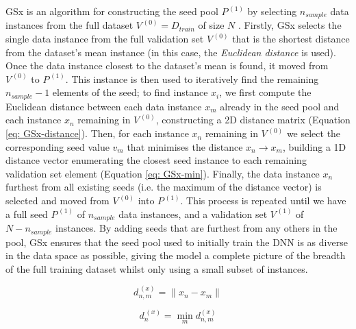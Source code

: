 \documentclass[a4paper, 11pt]{report}
\begin{document}
    GSx \citep{wu-2019} is an algorithm for constructing the seed pool $P^{\,(1)}$ by selecting $n_{sample}$ data instances from the full dataset $V^{\,(0)} = D_{train}$ of size $N$ \citep{wu-2019}. Firstly, GSx selects the single data instance from the full validation set $V^{\,(0)}$ that is the shortest distance from the dataset's mean instance (in this case, the \emph{Euclidean distance} is used). Once the data instance closest to the dataset's mean is found, it moved from $V^{\,(0)}$ to $P^{\,(1)}$. This instance is then used to iteratively find the remaining $n_{sample} - 1$ elements of the seed; to find instance $x_i$, we first compute the Euclidean distance between each data instance $x_m$ already in the seed pool and each instance $x_n$ remaining in $V^{\,(0)}$, constructing a 2D distance matrix (Equation \ref{eq: GSx-distance}). Then, for each instance $x_n$ remaining in $V^{\,(0)}$ we select the corresponding seed value $v_m$ that minimises the distance $x_n \to x_m$, building a 1D distance vector enumerating the closest seed instance to each remaining validation set element (Equation \ref{eq: GSx-min}). Finally, the data instance $x_n$ furthest from all existing seeds (i.e. the maximum of the distance vector) is selected and moved from $V^{\,(0)}$ into $P^{\,(1)}$. This process is repeated until we have a full seed $P^{\,(1)}$ of $n_{sample}$ data instances, and a validation set $V^{\,(1)}$ of $N - n_{sample}$ instances. By adding seeds that are furthest from any others in the pool, GSx ensures that the seed pool used to initially train the DNN is as diverse in the data space as possible, giving the model a complete picture of the breadth of the full training dataset whilst only using a small subset of instances.


    \begin{equation}
        \label{eq: GSx-distance}
        d^{\,(x)}_{n, m} = \lVert x_n - x_m \lVert
    \end{equation}
  
    \begin{equation}
        \label{eq: GSx-min}
        d^{\,(x)}_n = \min_m d^{(x)}_{n, m}
    \end{equation}
\end{document}
